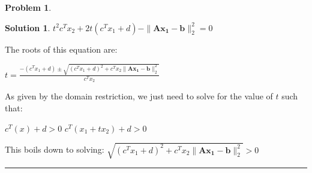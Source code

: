 \documentclass{article}
\theoremstyle{definition}
\newtheorem{problem}{Problem}
\def\fline{\rule{0.75\linewidth}{0.5pt}}
\newcommand{\finishline}{\begin{center}\fline\end{center}}
\newtheorem*{solution*}{Solution}
\newenvironment{solution}{\begin{solution*}}{{\finishline} \end{solution*}}
\begin{document}
\begin{problem}
\begin{enumerate}
\begin{solution}
         $t^2 c^Tx_2 + 2t(c^Tx_1 + d) - \|\mathbf{Ax_1 - b}\|^2_2  = 0 $ \newline 

         The roots of this equation are: \newline 

         $t = \frac{-(c^Tx_1 + d) \pm \sqrt{(c^Tx_1 + d)^2 + c^Tx_2 \|\mathbf{Ax_1 - b}\|^2_2}}{c^Tx_2}$

        As given by the domain restriction, we just need to solve for the value of $t$ such that: \newline 

        $c^T(x) + d > 0$ \newline 
        $c^T(x_1 + tx_2) + d > 0$ \newline 

        This boils down to solving: \newline 
        $\sqrt{(c^Tx_1 + d)^2 + c^Tx_2 \|\mathbf{Ax_1 - b}\|^2_2} > 0$

         
        
        
    \end{solution}
\end{enumerate}
\end{problem}
\end{document}
